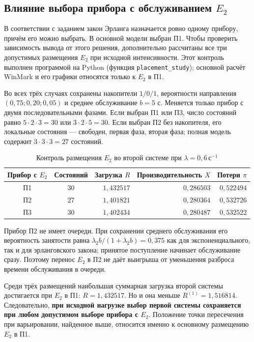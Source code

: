 \documentclass[a4paper,12pt]{article}
\newcommand{\secunit}{\,\text{с}^{-1}}
\begin{document}
\subsection{Влияние выбора прибора с обслуживанием \texorpdfstring{$E_2$}{E2}}\label{sec:placement}
В соответствии с заданием закон Эрланга назначается ровно одному прибору, причём его можно выбрать. В основной модели выбран П1. Чтобы проверить зависимость вывода от этого решения, дополнительно рассчитаны все три допустимых размещения $E_2$ при исходной интенсивности. Этот контроль выполнен программой на Python (функция \texttt{placement\_study}); основной расчёт WinMark и его графики относятся только к $E_2$ в П1.

Во всех трёх случаях сохранены накопители $1/0/1$, вероятности направления $(0{,}75;0{,}20;0{,}05)$ и среднее обслуживание $b=5$ с. Меняется только прибор с двумя последовательными фазами. Если выбран П1 или П3, число состояний равно $5\cdot2\cdot3=30$ или $3\cdot2\cdot5=30$. Если выбран П2 без накопителя, его локальные состояния --- свободен, первая фаза, вторая фаза; полная модель содержит $3\cdot3\cdot3=27$ состояний.

\begin{table}[H]\centering\small
\caption{Контроль размещения $E_2$ во второй системе при $\lambda=0{,}6\secunit$}\label{tab:placement}
\begin{tabular}{@{}ccrrr@{}}\toprule
Прибор с $E_2$ & Состояний & Загрузка $R$ & Производительность $X$ & Потери $\pi$\\\midrule
П1 & 30 & $1{,}432517$ & $0{,}286503$ & $0{,}522494$ \\
П2 & 27 & $1{,}401821$ & $0{,}280364$ & $0{,}532726$ \\
П3 & 30 & $1{,}402434$ & $0{,}280487$ & $0{,}532522$ \\
\bottomrule\end{tabular}
\end{table}

Прибор П2 не имеет очереди. При сохранении среднего обслуживания его вероятность занятости равна $\lambda_2b/(1+\lambda_2b)=0{,}375$ как для экспоненциального, так и для эрланговского закона; принятое поступление начинает обслуживание сразу. Поэтому перенос $E_2$ в П2 не даёт выигрыша от уменьшения разброса времени обслуживания в очереди.

Среди трёх размещений наибольшая суммарная загрузка второй системы достигается при $E_2$ в П1: $R=1{,}432517$. Но и она меньше $R^{(1)}=1{,}516814$. Следовательно, \textbf{при исходной нагрузке выбор первой системы сохраняется при любом допустимом выборе прибора с $E_2$}. Положение точки пересечения при варьировании, найденное выше, относится именно к основному размещению $E_2$ в П1.
\end{document}
